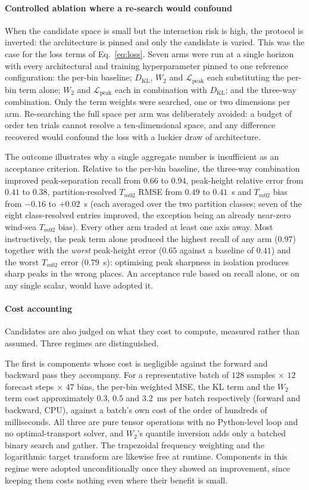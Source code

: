 \paragraph{Controlled ablation where a re-search would confound}
When the candidate space is small but the interaction risk is high, the protocol is inverted: the architecture is pinned and only the candidate is varied. This was the case for the loss terms of Eq.~\eqref{eq:loss}. Seven arms were run at a single horizon with every architectural and training hyperparameter pinned to one reference configuration: the per-bin baseline; $D_{\text{KL}}$, $W_2$ and $\mathcal{L}_{\text{peak}}$ each substituting the per-bin term alone; $W_2$ and $\mathcal{L}_{\text{peak}}$ each in combination with $D_{\text{KL}}$; and the three-way combination. Only the term weights were searched, one or two dimensions per arm. Re-searching the full space per arm was deliberately avoided: a budget of order ten trials cannot resolve a ten-dimensional space, and any difference recovered would confound the loss with a luckier draw of architecture.

The outcome illustrates why a single aggregate number is insufficient as an acceptance criterion. Relative to the per-bin baseline, the three-way combination improved peak-separation recall from $0.66$ to $0.94$, peak-height relative error from $0.41$ to $0.38$, partition-resolved $T_{m02}$ RMSE from $0.49$ to $0.41$~s and $T_{m02}$ bias from $-0.16$ to $+0.02$~s (each averaged over the two partition classes; seven of the eight class-resolved entries improved, the exception being an already near-zero wind-sea $T_{m02}$ bias). Every other arm traded at least one axis away. Most instructively, the peak term alone produced the highest recall of any arm ($0.97$) together with the \emph{worst} peak-height error ($0.65$ against a baseline of $0.41$) and the worst $T_{m02}$ error ($0.79$~s): optimising peak sharpness in isolation produces sharp peaks in the wrong places. An acceptance rule based on recall alone, or on any single scalar, would have adopted it.

\paragraph{Cost accounting}
Candidates are also judged on what they cost to compute, measured rather than assumed. Three regimes are distinguished.

The first is components whose cost is negligible against the forward and backward pass they accompany. For a representative batch of $128$ samples $\times$ $12$ forecast steps $\times$ $47$ bins, the per-bin weighted MSE, the KL term and the $W_2$ term cost approximately $0.3$, $0.5$ and $3.2$~ms per batch respectively (forward and backward, CPU), against a batch's own cost of the order of hundreds of milliseconds. All three are pure tensor operations with no Python-level loop and no optimal-transport solver, and $W_2$'s quantile inversion adds only a batched binary search and gather. The trapezoidal frequency weighting and the logarithmic target transform are likewise free at runtime. Components in this regime were adopted unconditionally once they showed an improvement, since keeping them costs nothing even where their benefit is small.

